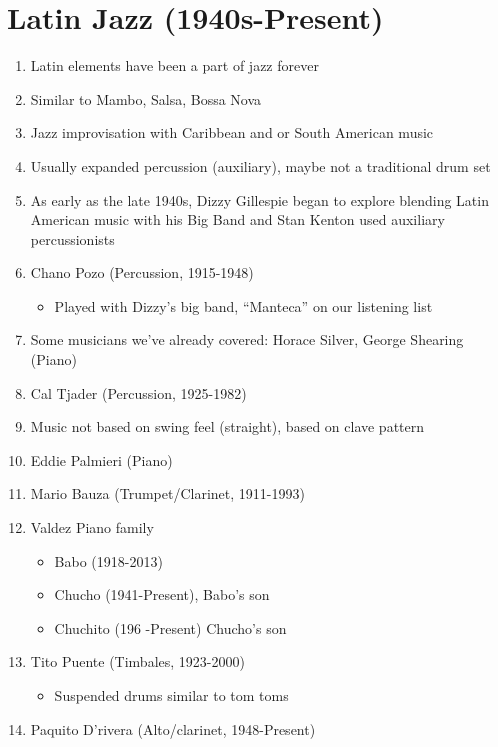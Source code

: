 \documentclass[]{article}
\providecommand{\tightlist}{%
  \setlength{\itemsep}{0pt}\setlength{\parskip}{0pt}}
\begin{document}
\section{Latin Jazz (1940s-Present)}\label{latin-jazz-1940s-present}

\begin{enumerate}
\def\labelenumi{\arabic{enumi}.}
\tightlist
\item
  Latin elements have been a part of jazz forever
\item
  Similar to Mambo, Salsa, Bossa Nova
\item
  Jazz improvisation with Caribbean and or South American music
\item
  Usually expanded percussion (auxiliary), maybe not a traditional drum
  set
\item
  As early as the late 1940s, Dizzy Gillespie began to explore blending
  Latin American music with his Big Band and Stan Kenton used auxiliary
  percussionists
\item
  Chano Pozo (Percussion, 1915-1948)

  \begin{itemize}
  \tightlist
  \item
    Played with Dizzy's big band, ``Manteca'' on our listening list
  \end{itemize}
\item
  Some musicians we've already covered: Horace Silver, George Shearing
  (Piano)
\item
  Cal Tjader (Percussion, 1925-1982)
\item
  Music not based on swing feel (straight), based on clave pattern
\item
  Eddie Palmieri (Piano)
\item
  Mario Bauza (Trumpet/Clarinet, 1911-1993)
\item
  Valdez Piano family

  \begin{itemize}
  \tightlist
  \item
    Babo (1918-2013)
  \item
    Chucho (1941-Present), Babo's son
  \item
    Chuchito (196 -Present) Chucho's son
  \end{itemize}
\item
  Tito Puente (Timbales, 1923-2000)

  \begin{itemize}
  \tightlist
  \item
    Suspended drums similar to tom toms
  \end{itemize}
\item
  Paquito D'rivera (Alto/clarinet, 1948-Present)


\end{enumerate}
\end{document}
